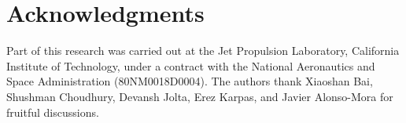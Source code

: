 \documentclass[conference]{IEEEtran}
\newcommand{\mpmargin}[2]{{\color{cyan}#1}\marginpar{\color{cyan}\raggedright\footnotesize [MP]:#2}}
\newcommand{\frline}[2]{{\color{blue}#1}{\em \color{blue}[FR]: #2}}
\newcommand{\mpmargin}[2]{#1}
\newcommand{\frline}[2]{#1}
\begin{document}

\section*{Acknowledgments}
Part of this research was carried out at the Jet Propulsion Laboratory, California Institute of Technology, under a contract with the National Aeronautics and Space Administration (80NM0018D0004). The authors thank Xiaoshan Bai, Shushman Choudhury, Devansh Jolta, Erez Karpas, and Javier Alonso-Mora for fruitful discussions.
\end{document}
